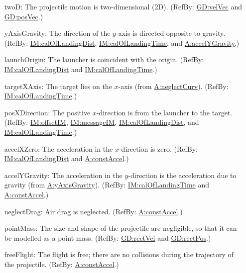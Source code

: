 \documentclass[12pt]{article}
\begin{document}
\begin{itemize}
\item[twoD:\phantomsection\label{twoD}]{The projectile motion is two-dimensional (2D). (RefBy: \hyperref[GD:velVec]{GD:velVec} and \hyperref[GD:posVec]{GD:posVec}.)}
\item[yAxisGravity:\phantomsection\label{yAxisGravity}]{The direction of the $y$-axis is directed opposite to gravity. (RefBy: \hyperref[IM:calOfLandingDist]{IM:calOfLandingDist}, \hyperref[IM:calOfLandingTime]{IM:calOfLandingTime}, and \hyperref[accelYGravity]{A:accelYGravity}.)}
\item[launchOrigin:\phantomsection\label{launchOrigin}]{The launcher is coincident with the origin. (RefBy: \hyperref[IM:calOfLandingDist]{IM:calOfLandingDist} and \hyperref[IM:calOfLandingTime]{IM:calOfLandingTime}.)}
\item[targetXAxis:\phantomsection\label{targetXAxis}]{The target lies on the $x$-axis (from \hyperref[neglectCurv]{A:neglectCurv}). (RefBy: \hyperref[IM:calOfLandingTime]{IM:calOfLandingTime}.)}
\item[posXDirection:\phantomsection\label{posXDirection}]{The positive $x$-direction is from the launcher to the target. (RefBy: \hyperref[IM:offsetIM]{IM:offsetIM}, \hyperref[IM:messageIM]{IM:messageIM}, \hyperref[IM:calOfLandingDist]{IM:calOfLandingDist}, and \hyperref[IM:calOfLandingTime]{IM:calOfLandingTime}.)}
\item[accelXZero:\phantomsection\label{accelXZero}]{The acceleration in the $x$-direction is zero. (RefBy: \hyperref[IM:calOfLandingDist]{IM:calOfLandingDist} and \hyperref[constAccel]{A:constAccel}.)}
\item[accelYGravity:\phantomsection\label{accelYGravity}]{The acceleration in the $y$-direction is the acceleration due to gravity (from \hyperref[yAxisGravity]{A:yAxisGravity}). (RefBy: \hyperref[IM:calOfLandingTime]{IM:calOfLandingTime} and \hyperref[constAccel]{A:constAccel}.)}
\item[neglectDrag:\phantomsection\label{neglectDrag}]{Air drag is neglected. (RefBy: \hyperref[constAccel]{A:constAccel}.)}
\item[pointMass:\phantomsection\label{pointMass}]{The size and shape of the projectile are negligible, so that it can be modelled as a point mass. (RefBy: \hyperref[GD:rectVel]{GD:rectVel} and \hyperref[GD:rectPos]{GD:rectPos}.)}
\item[freeFlight:\phantomsection\label{freeFlight}]{The flight is free; there are no collisions during the trajectory of the projectile. (RefBy: \hyperref[constAccel]{A:constAccel}.)}

\end{itemize}
\end{document}
